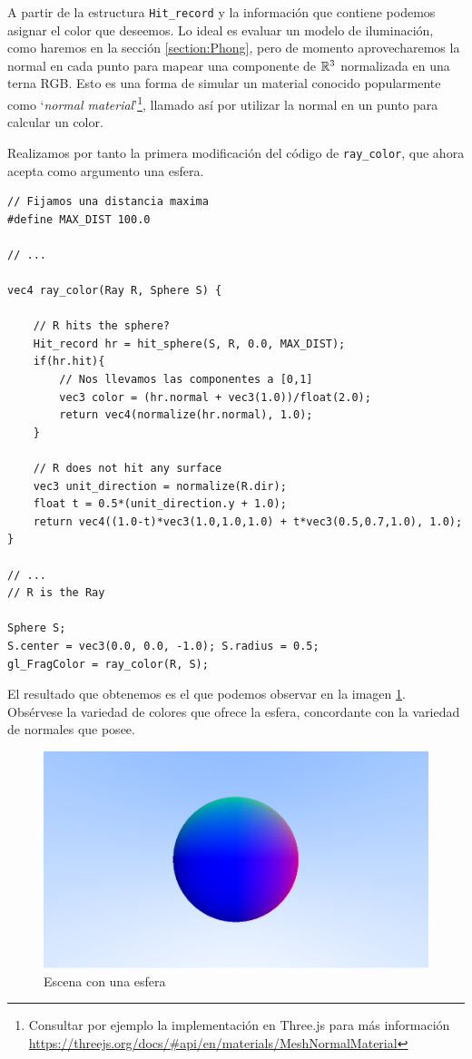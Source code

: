 A partir de la estructura \verb|Hit_record| y la información que contiene podemos asignar el color que deseemos. Lo ideal es evaluar un modelo de iluminación, como haremos en la sección \ref{section:Phong}, pero de momento aprovecharemos la normal en cada punto para mapear una componente de $\mathbb{R}^3$ normalizada en una terna RGB. Esto es una forma de simular un material conocido popularmente como `\textit{normal material}'\footnote{Consultar por ejemplo la implementación en Three.js para más información \url{https://threejs.org/docs/\#api/en/materials/MeshNormalMaterial}}, llamado así por utilizar la normal en un punto para calcular un color.

Realizamos por tanto la primera modificación del código de \verb|ray_color|, que ahora acepta como argumento una esfera.

\begin{lstlisting}
// Fijamos una distancia maxima
#define MAX_DIST 100.0

// ... 

vec4 ray_color(Ray R, Sphere S) {

    // R hits the sphere?
    Hit_record hr = hit_sphere(S, R, 0.0, MAX_DIST);
    if(hr.hit){
        // Nos llevamos las componentes a [0,1]
        vec3 color = (hr.normal + vec3(1.0))/float(2.0);
        return vec4(normalize(hr.normal), 1.0);
    }

    // R does not hit any surface
    vec3 unit_direction = normalize(R.dir);
    float t = 0.5*(unit_direction.y + 1.0);
    return vec4((1.0-t)*vec3(1.0,1.0,1.0) + t*vec3(0.5,0.7,1.0), 1.0);
}

// ... 
// R is the Ray

Sphere S; 
S.center = vec3(0.0, 0.0, -1.0); S.radius = 0.5;
gl_FragColor = ray_color(R, S);
\end{lstlisting}

El resultado que obtenemos es el que podemos observar en la imagen \ref{fig:una-esfera}. Obsérvese la variedad de colores que ofrece la esfera, concordante con la variedad de normales que posee.

\begin{figure} [ht]
    \centering
    \includegraphics[scale = 0.3]{img/C7/esfera_renderizada.png}
    \caption{Escena con una esfera}
    \label{fig:una-esfera}
\end{figure}

